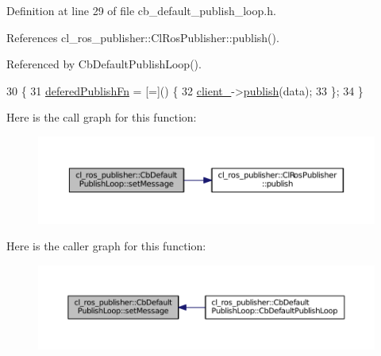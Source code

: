 Definition at line 29 of file cb\+\_\+default\+\_\+publish\+\_\+loop.\+h.



References cl\+\_\+ros\+\_\+publisher\+::\+Cl\+Ros\+Publisher\+::publish().



Referenced by Cb\+Default\+Publish\+Loop().


\begin{DoxyCode}
30     \{
31         \hyperlink{classcl__ros__publisher_1_1CbDefaultPublishLoop_ac0044704637edbd8f79a69d5b06de9ba}{deferedPublishFn} = [=]() \{
32             \hyperlink{classcl__ros__publisher_1_1CbDefaultPublishLoop_a483b8c34b88dadc718fbf4bf1f95acb5}{client\_}->\hyperlink{classcl__ros__publisher_1_1ClRosPublisher_a3517d62fb0703a0a72efe6de7ad1a6d8}{publish}(data);
33         \};
34     \}
\end{DoxyCode}


Here is the call graph for this function\+:
\nopagebreak
\begin{figure}[H]
\begin{center}
\leavevmode
\includegraphics[width=350pt]{classcl__ros__publisher_1_1CbDefaultPublishLoop_a0377d84fde4cd1193abe5daf172359a7_cgraph}
\end{center}
\end{figure}




Here is the caller graph for this function\+:
\nopagebreak
\begin{figure}[H]
\begin{center}
\leavevmode
\includegraphics[width=350pt]{classcl__ros__publisher_1_1CbDefaultPublishLoop_a0377d84fde4cd1193abe5daf172359a7_icgraph}
\end{center}
\end{figure}


